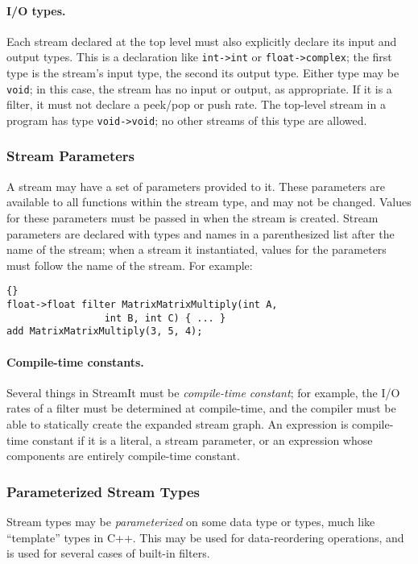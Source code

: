 \documentclass[11pt]{article}
\begin{document}
\paragraph{I/O types.}  Each stream declared at the top level must
also explicitly declare its input and output types.  This is a
declaration like \lstinline|int->int| or \lstinline|float->complex|; the first
type is the stream's input type, the second its output type.  Either
type may be \lstinline|void|; in this case, the stream has no input or
output, as appropriate.  If it is a filter, it must not declare a
peek/pop or push rate.  The top-level stream in a program has type
\lstinline|void->void|; no other streams of this type are allowed.

\subsubsection{Stream Parameters}

A stream may have a set of parameters provided to it.  These
parameters are available to all functions within the stream type, and
may not be changed.  Values for these parameters must be passed in
when the stream is created.  Stream parameters are declared with types
and names in a parenthesized list after the name of the stream; when a
stream it instantiated, values for the parameters must follow the name
of the stream.  For example:

\begin{lstlisting}{}
float->float filter MatrixMatrixMultiply(int A,
                 int B, int C) { ... }
add MatrixMatrixMultiply(3, 5, 4);
\end{lstlisting}

\paragraph{Compile-time constants.}  Several things in StreamIt must
be \emph{compile-time constant}; for example, the I/O rates of a
filter must be determined at compile-time, and the compiler must be
able to statically create the expanded stream graph.  An expression is
compile-time constant if it is a literal, a stream parameter, or an
expression whose components are entirely compile-time constant.

\subsubsection{Parameterized Stream Types}

Stream types may be \emph{parameterized} on some data type or types,
much like ``template'' types in C++.  This may be used for
data-reordering operations, and is used for several cases of built-in
filters.
\end{document}
